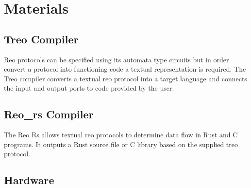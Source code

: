 \section{Materials}
\subsection{Treo Compiler} \label{sec:treo}
Reo protocols can be specified using its automata type circuits but in order convert a protocol into functioning code a textual representation is required. The Treo \cite{treo} compiler \cite{reo:git} converts a textual reo protocol into a target language and connects the input and output ports to code provided by the user.

\subsection{Reo\_rs Compiler}
The Reo Rs \cite{reors:git} allows textual reo protocols to determine data flow in Rust and C programs. It outputs a Rust source file or C library based on the supplied treo protocol.

\subsection{Hardware}
